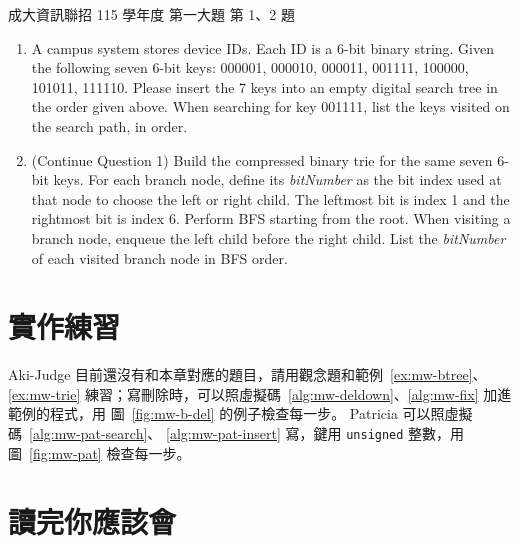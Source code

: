 \begin{pastexam}[label={px:mw-5}]{成大資訊聯招 115 學年度 第一大題 第 1、2 題}
\begin{enumerate}
\item[1.] [3\%] A campus system stores device IDs. Each ID is a 6-bit binary string. Given the following seven 6-bit keys: 000001, 000010, 000011, 001111, 100000, 101011, 111110. Please insert the 7 keys into an empty digital search tree in the order given above. When searching for key 001111, list the keys visited on the search path, in order.\par\smallskip
{}\par\smallskip

\item[2.] [4\%] (Continue Question 1) Build the compressed binary trie for the same seven 6-bit keys. For each branch node, define its \textit{bitNumber} as the bit index used at that node to choose the left or right child. The leftmost bit is index 1 and the rightmost bit is index 6. Perform BFS starting from the root. When visiting a branch node, enqueue the left child before the right child. List the \textit{bitNumber} of each visited branch node in BFS order.\par\smallskip
{}
\end{enumerate}
\end{pastexam}

\section{實作練習}
\label{sec:mw-practice}

Aki-Judge 目前還沒有和本章對應的題目，請用觀念題和範例~\ref{ex:mw-btree}、\ref{ex:mw-trie}
練習；寫刪除時，可以照虛擬碼~\ref{alg:mw-deldown}、\ref{alg:mw-fix} 加進範例的程式，用
圖~\ref{fig:mw-b-del} 的例子檢查每一步。 Patricia 可以照虛擬碼~\ref{alg:mw-pat-search}、
\ref{alg:mw-pat-insert} 寫，鍵用 \texttt{unsigned} 整數，用圖~\ref{fig:mw-pat} 檢查每一步。

\section{讀完你應該會}
\label{sec:mw-checklist}

